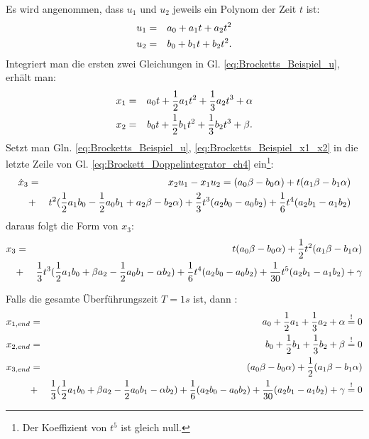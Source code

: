 Es wird angenommen, dass $u_{1}$ und $u_{2}$ jeweils ein Polynom der Zeit $t$ ist:
\begin{eqnarray}
u_{1} &=& a_{0}+a_{1}t+a_{2}t^{2}\notag\\
u_{2} &=& b_{0}+b_{1}t+b_{2}t^{2}.
\label{eq:Brocketts_Beispiel_u}
\end{eqnarray}
Integriert man die ersten zwei Gleichungen in Gl. \eqref{eq:Brocketts_Beispiel_u}, erhält man:
\begin{eqnarray}
x_{1} &=& a_{0}t +\frac{1}{2}a_{1}t^{2}+\frac{1}{3}a_{2}t^{3}+\alpha \notag\\
x_{2} &=& b_{0}t +\frac{1}{2}b_{1}t^{2}+\frac{1}{3}b_{2}t^{3}+\beta.
\label{eq:Brocketts_Beispiel_x1_x2}
\end{eqnarray}
Setzt man Gln. \eqref{eq:Brocketts_Beispiel_u}, \eqref{eq:Brocketts_Beispiel_x1_x2} in die letzte Zeile von Gl. \eqref{eq:Brockett_Doppelintegrator_ch4} ein\footnote{Der Koeffizient von $t^{5}$ ist gleich null.}:
\begin{eqnarray}
\dot{x}_{3} &=& x_{2}u_{1}-x_{1}u_{2} = (a_{0}\beta-b_{0}\alpha) + t(a_{1}\beta-b_{1}\alpha)\notag\\ &+& t^2(\frac{1}{2}a_{1}b_{0}-\frac{1}{2}a_{0}b_{1}+a_{2}\beta-b_{2}\alpha)+\frac{2}{3}t^3(a_{2}b_{0}-a_{0}b_{2})+\frac{1}{6}t^4(a_{2}b_{1}-a_{1}b_{2})
\label{eq:Brocketts_Beispiel_dot_x3}
\end{eqnarray}
daraus folgt die Form von $x_{3}$:
\begin{eqnarray}
{x}_{3} &=& t(a_{0}\beta-b_{0}\alpha) + \frac{1}{2}t^{2}(a_{1}\beta-b_{1}\alpha)\notag\\ &+& \frac{1}{3}t^3(\frac{1}{2}a_{1}b_{0}+\beta a_{2}-\frac{1}{2}a_{0}b_{1}-\alpha b_{2})+\frac{1}{6}t^4(a_{2}b_{0}-a_{0}b_{2})+\frac{1}{30}t^5(a_{2}b_{1}-a_{1}b_{2}) + \gamma\notag\\
\label{eq:Brocketts_Beispiel_x3}
\end{eqnarray}

Falls die gesamte Überführungszeit $T=1s$ ist, dann :
\begin{eqnarray}
x_{1,end} &=& a_{0}+\frac{1}{2}a_{1}+\frac{1}{3}a_{2} + \alpha\stackrel{!}{=}0\notag\\
x_{2,end} &=& b_{0}+\frac{1}{2}b_{1}+\frac{1}{3}b_{2} + \beta\stackrel{!}{=}0\notag\\
{x}_{3,end} &=& (a_{0}\beta-b_{0}\alpha) + \frac{1}{2}(a_{1}\beta-b_{1}\alpha)\notag\\ &+& \frac{1}{3}(\frac{1}{2}a_{1}b_{0}+\beta a_{2}-\frac{1}{2}a_{0}b_{1}-\alpha b_{2})+\frac{1}{6}(a_{2}b_{0}-a_{0}b_{2})+\frac{1}{30}(a_{2}b_{1}-a_{1}b_{2}) + \gamma\stackrel{!}{=}0\notag\\
\label{eq:Brocketts_Beispiel_t_1s}
\end{eqnarray}


